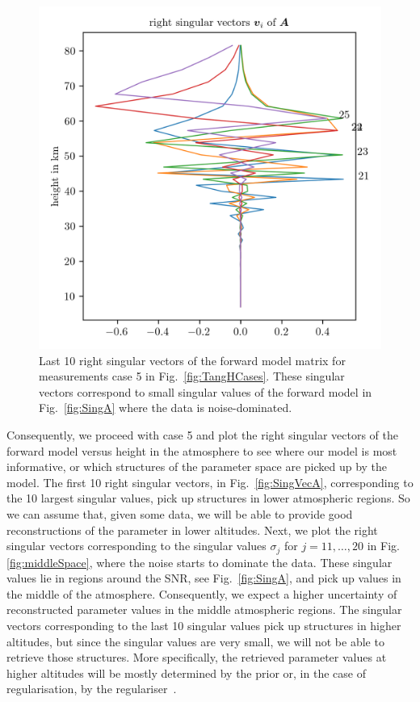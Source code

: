 \begin{figure}[ht!]
	\centering
	\includegraphics{NullVecA.png}
	\caption[Last 10 right singular vectors of forward model.]{Last 10 right singular vectors of the forward model matrix for measurements case 5 in Fig.~\ref{fig:TangHCases}. These singular vectors correspond to small singular values of the forward model in Fig.~\ref{fig:SingA} where the data is noise-dominated.}
	\label{fig:nullSpace}
\end{figure}

Consequently, we proceed with case 5 and plot the right singular vectors of the forward model versus height in the atmosphere to see where our model is most informative, or which structures of the parameter space are picked up by the model.
The first 10 right singular vectors, in Fig.~\ref{fig:SingVecA}, corresponding to the 10 largest singular values, pick up structures in lower atmospheric regions.
So we can assume that, given some data, we will be able to provide good reconstructions of the parameter in lower altitudes.
Next, we plot the right singular vectors corresponding to the singular values $\sigma_j$ for $j = 11, \dots, 20$ in Fig. \ref{fig:middleSpace}, where the noise starts to dominate the data.
These singular values lie in regions around the SNR, see Fig.~\ref{fig:SingA}, and pick up values in the middle of the atmosphere.
Consequently, we expect a higher uncertainty of reconstructed parameter values in the middle atmospheric regions.
The singular vectors corresponding to the last 10 singular values pick up structures in higher altitudes, but since the singular values are very small, we will not be able to retrieve those structures.
More specifically, the retrieved parameter values at higher altitudes will be mostly determined by the prior or, in the case of regularisation, by the regulariser~\cite{tan2016LecNot}.

